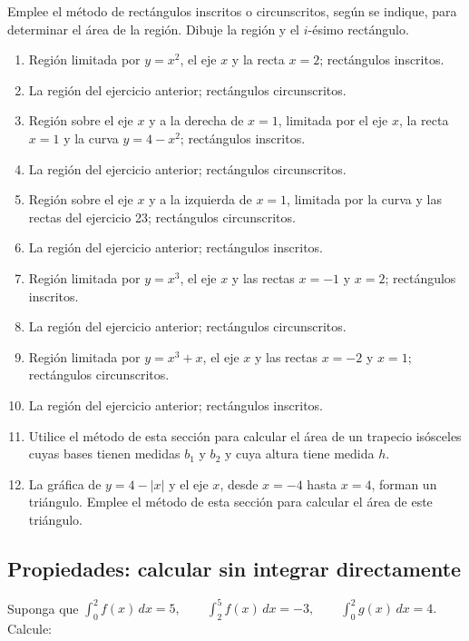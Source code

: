 \documentclass[12pt]{article}
\begin{document}
Emplee el método de rectángulos inscritos o circunscritos, según se indique, para determinar el área de la región. Dibuje la región y el $i$-ésimo rectángulo.

\begin{enumerate}[resume]
\item Región limitada por $y=x^2$, el eje $x$ y la recta $x=2$; rectángulos inscritos.
\item La región del ejercicio anterior; rectángulos circunscritos.
\item Región sobre el eje $x$ y a la derecha de $x=1$, limitada por el eje $x$, la recta $x=1$ y la curva $y=4-x^2$; rectángulos inscritos.
\item La región del ejercicio anterior; rectángulos circunscritos.
\item Región sobre el eje $x$ y a la izquierda de $x=1$, limitada por la curva y las rectas del ejercicio 23; rectángulos circunscritos.
\item La región del ejercicio anterior; rectángulos inscritos.
\item Región limitada por $y=x^3$, el eje $x$ y las rectas $x=-1$ y $x=2$; rectángulos inscritos.
\item La región del ejercicio anterior; rectángulos circunscritos.
\item Región limitada por $y=x^3+x$, el eje $x$ y las rectas $x=-2$ y $x=1$; rectángulos circunscritos.
\item La región del ejercicio anterior; rectángulos inscritos.
\item Utilice el método de esta sección para calcular el área de un trapecio isósceles cuyas bases tienen medidas $b_1$ y $b_2$ y cuya altura tiene medida $h$.
\item La gráfica de $y=4-|x|$ y el eje $x$, desde $x=-4$ hasta $x=4$, forman un triángulo. Emplee el método de esta sección para calcular el área de este triángulo.
\end{enumerate}

\subsection*{Propiedades: calcular sin integrar directamente}
Suponga que
$
\int_0^2f(x)\,dx=5,\qquad \int_2^5f(x)\,dx=-3,
\qquad \int_0^2g(x)\,dx=4.
$
Calcule:
\end{document}
